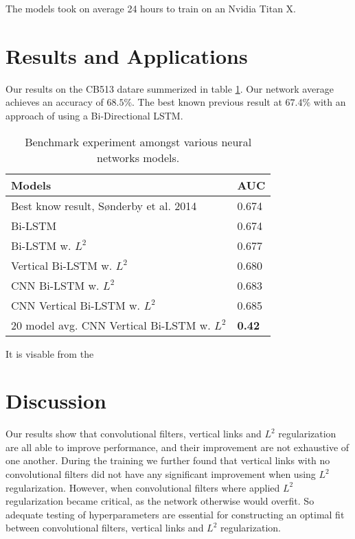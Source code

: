 \documentclass{article}
\begin{document}
The models took on average 24 hours to train on an Nvidia Titan X.

\section{Results and Applications}
Our results on the CB513 datare summerized in table \ref{tab:AUC}. Our network average achieves an accuracy of $68.5\%$. The best known previous result at $67.4\%$ with an approach of using a Bi-Directional LSTM.
\begin{table}[htb]
    \centering

    \begin{tabular}{|l|l|}
    \hline
    Models & AUC    \\ \hline
    Best know result, S\o nderby et al. 2014 \cite{sonderby2014protein}    & 0.674 \\
    Bi-LSTM & 0.674 \\
    Bi-LSTM w. $L^2$    & 0.677 \\
    Vertical Bi-LSTM w. $L^2$     & 0.680 \\
    CNN Bi-LSTM w. $L^2$   & 0.683 \\
    CNN Vertical Bi-LSTM w. $L^2$ & 0.685 \\ \hline
    20 model avg. CNN Vertical Bi-LSTM w. $L^2$ & \textbf{0.42} \\ \hline
    \end{tabular}

    \caption{Benchmark experiment amongst various neural networks models.}
    \label{tab:AUC}
It is visable from the 


\end{table}

\section{Discussion}
Our results show that convolutional filters, vertical links and $L^2$ regularization are all able to improve performance, and their improvement are not exhaustive of one another. During the training we further found that vertical links with no convolutional filters did not have any significant improvement when using $L^2$ regularization. However, when convolutional filters where applied $L^2$ regularization became critical, as the network otherwise would overfit. So adequate testing of hyperparameters are essential for constructing an optimal fit between convolutional filters, vertical links and $L^2$ regularization.



\end{document}
